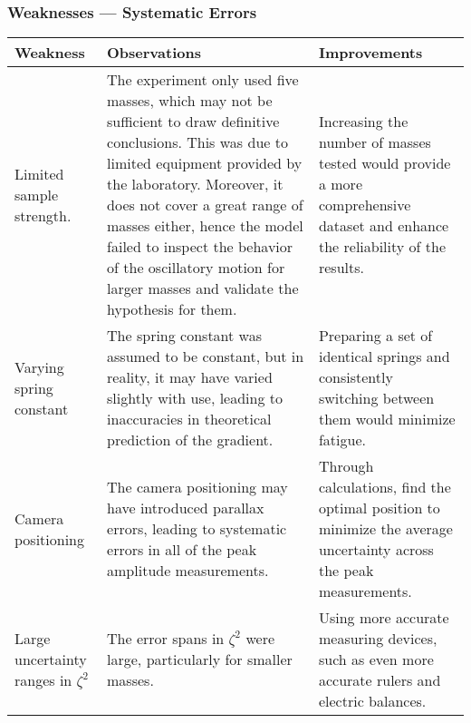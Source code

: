 \documentclass[a4paper,12pt]{article}
\newcommand{\thcolor}{\cellcolor{Blue!25}}
\begin{document}
\subsubsection{Weaknesses --- Systematic Errors}
\begin{center}
  \begin{longtable}{|p{}|p{}|p{}|}
    \hline
    \thcolor Weakness                     & \thcolor Observations                                                                                                                                                                                                                                                                                                                                        & \thcolor Improvements                                                                                                         \\ \hline
    Limited sample strength.              & The experiment only used five masses, which may not be sufficient to draw definitive conclusions. This was due to limited equipment provided by the laboratory. Moreover, it does not cover a great range of masses either, hence the model failed to inspect the behavior of the oscillatory motion for larger masses and validate the hypothesis for them. & Increasing the number of masses tested would provide a more comprehensive dataset and enhance the reliability of the results. \\ \hline
    Varying spring constant               & The spring constant was assumed to be constant, but in reality, it may have varied slightly with use, leading to inaccuracies in theoretical prediction of the gradient.                                                                                                                                                                                     & Preparing a set of identical springs and consistently switching between them would minimize fatigue.                          \\ \hline
    Camera positioning                    & The camera positioning may have introduced parallax errors, leading to systematic errors in all of the peak amplitude measurements.                                                                                                                                                                                                                          & Through calculations, find the optimal position to minimize the average uncertainty across the peak measurements.             \\ \hline
    Large uncertainty ranges in $\zeta^2$ & The error spans in $\zeta^2$ were large, particularly for smaller masses.                                                                                                                                                                                                                                                                                    & Using more accurate measuring devices, such as even more accurate rulers and electric balances.                               \\ \hline
  \end{longtable}
\end{center}
\end{document}
